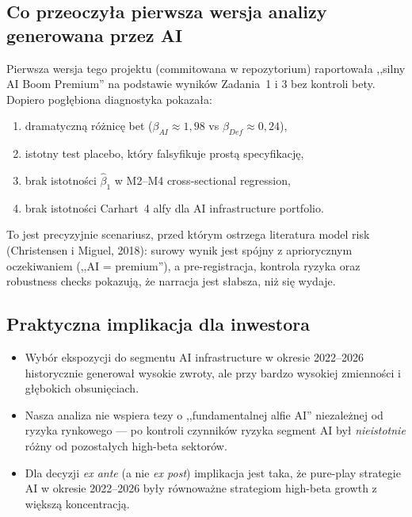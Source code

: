 \documentclass[11pt,a4paper]{article}
\begin{document}
\subsection{Co przeoczyła pierwsza wersja analizy generowana przez AI}
Pierwsza wersja tego projektu (commitowana w repozytorium) raportowała
,,silny AI Boom Premium'' na podstawie wyników Zadania~1 i 3 bez kontroli bety.
Dopiero pogłębiona diagnostyka pokazała:
\begin{enumerate}
  \item dramatyczną różnicę bet ($\beta_{AI} \approx 1{,}98$ vs $\beta_{Def} \approx 0{,}24$),
  \item istotny test placebo, który falsyfikuje prostą specyfikację,
  \item brak istotności $\hat\beta_1$ w M2--M4 cross-sectional regression,
  \item brak istotności Carhart~4 alfy dla AI infrastructure portfolio.
\end{enumerate}
To jest precyzyjnie scenariusz, przed którym ostrzega literatura model risk
(Christensen i Miguel, 2018): surowy wynik jest spójny z apriorycznym
oczekiwaniem (,,AI = premium''), a pre-registracja, kontrola ryzyka oraz
robustness checks pokazują, że narracja jest słabsza, niż się wydaje.

\subsection{Praktyczna implikacja dla inwestora}
\begin{itemize}
  \item Wybór ekspozycji do segmentu AI infrastructure w okresie 2022--2026
        historycznie generował wysokie zwroty, ale przy bardzo wysokiej
        zmienności i głębokich obsunięciach.
  \item Nasza analiza nie wspiera tezy o ,,fundamentalnej alfie AI'' niezależnej
        od ryzyka rynkowego --- po kontroli czynników ryzyka segment AI był
        \emph{nieistotnie} różny od pozostałych high-beta sektorów.
  \item Dla decyzji \emph{ex ante} (a nie \emph{ex post}) implikacja jest taka,
        że pure-play strategie AI w okresie 2022--2026 były równoważne strategiom
        high-beta growth z większą koncentracją.
\end{itemize}
\end{document}
